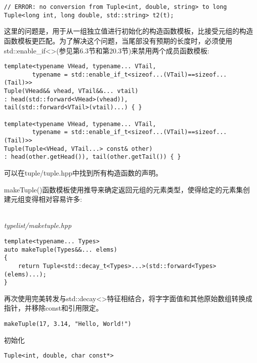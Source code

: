 \begin{lstlisting}[style=styleCXX]
// ERROR: no conversion from Tuple<int, double, string> to long
Tuple<long int, long double, std::string> t2(t);
\end{lstlisting}

这里的问题是，用于从一组独立值进行初始化的构造函数模板，比接受元组的构造函数模板更匹配。为了解决这个问题，当尾部没有预期的长度时，必须使用std::enable\_if<>(参见第6.3节和第20.3节)来禁用两个成员函数模板:

\begin{lstlisting}[style=styleCXX]
template<typename VHead, typename... VTail,
		typename = std::enable_if_t<sizeof...(VTail)==sizeof...(Tail)>>
Tuple(VHead&& vhead, VTail&&... vtail)
: head(std::forward<VHead>(vhead)),
tail(std::forward<VTail>(vtail)...) { }

template<typename VHead, typename... VTail,
		typename = std::enable_if_t<sizeof...(VTail)==sizeof...(Tail)>>
Tuple(Tuple<VHead, VTail...> const& other)
: head(other.getHead()), tail(other.getTail()) { }
\end{lstlisting}

可以在tuple/tuple.hpp中找到所有构造函数的声明。

makeTuple()函数模板使用推导来确定返回元组的元素类型，使得给定的元素集创建元组变得相对容易许多:

\hspace*{\fill} \\ %
\noindent
\textit{typelist/maketuple.hpp}
\begin{lstlisting}[style=styleCXX]
template<typename... Types>
auto makeTuple(Types&&... elems)
{
	return Tuple<std::decay_t<Types>...>(std::forward<Types>(elems)...);
}
\end{lstlisting}

再次使用完美转发与std::decay<>特征相结合，将字字面值和其他原始数组转换成指针，并移除const和引用限定。

\begin{lstlisting}[style=styleCXX]
makeTuple(17, 3.14, "Hello, World!")
\end{lstlisting}

初始化

\begin{lstlisting}[style=styleCXX]
Tuple<int, double, char const*>
\end{lstlisting}







